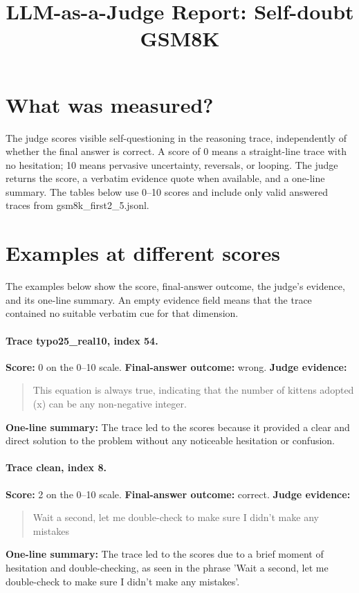 \documentclass[11pt]{article}
\title{LLM-as-a-Judge Report: Self-doubt\\\large GSM8K}
\date{}
\begin{document}
\maketitle

\section*{What was measured?} The judge scores visible self-questioning in the reasoning trace, independently of whether the final answer is correct. A score of 0 means a straight-line trace with no hesitation; 10 means pervasive uncertainty, reversals, or looping. The judge returns the score, a verbatim evidence quote when available, and a one-line summary. The tables below use 0--10 scores and include only valid answered traces from gsm8k\_first2\_5.jsonl.

\section*{Examples at different scores} The examples below show the score, final-answer outcome, the judge's evidence, and its one-line summary. An empty evidence field means that the trace contained no suitable verbatim cue for that dimension.

\paragraph{Trace typo25\_real10, index 54.}
\textbf{Score:} 0 on the 0--10 scale. \textbf{Final-answer outcome:} wrong.
\textbf{Judge evidence:} \begin{quote}This equation is always true, indicating that the number of kittens adopted (x) can be any non-negative integer.\end{quote}
\textbf{One-line summary:} The trace led to the scores because it provided a clear and direct solution to the problem without any noticeable hesitation or confusion.\medskip
\paragraph{Trace clean, index 8.}
\textbf{Score:} 2 on the 0--10 scale. \textbf{Final-answer outcome:} correct.
\textbf{Judge evidence:} \begin{quote}Wait a second, let me double-check to make sure I didn't make any mistakes\end{quote}
\textbf{One-line summary:} The trace led to the scores due to a brief moment of hesitation and double-checking, as seen in the phrase 'Wait a second, let me double-check to make sure I didn't make any mistakes'.\medskip
\end{document}
